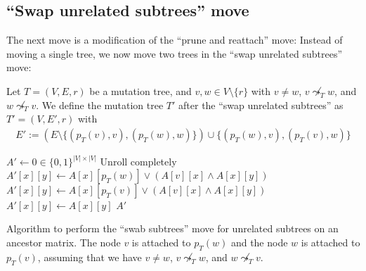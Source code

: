 \subsection{``Swap unrelated subtrees'' move}

The next move is a modification of the ``prune and reattach'' move: Instead of moving a single tree, we now move two trees in the ``swap unrelated subtrees'' move:

\begin{definition}
    \label{def:swap_unrelated_subtrees}
    Let $T = (V, E, r)$ be a mutation tree, and $v, w \in V \setminus \{r\}$ with $v \neq w$, $v \not\leadsto_T w$, and $w \not\leadsto_T v$. We define the mutation tree $T'$ after the ``swap unrelated subtrees'' as $T' = (V, E', r)$ with
    \begin{align*}
        E' := (E \setminus \{(p_T(v), v), (p_T(w), w)\}) \cup \{(p_T(w), v), (p_T(v), w)\}
    \end{align*}
\end{definition}

\begin{algorithm}
    \begin{algorithmic}[1]
        \State $A' \leftarrow 0 \in \{0,1\}^{|V| \times |V|}$
             \Comment Unroll completely
                    \State $A'[x][y] \leftarrow A[x][p_T(w)] \vee (A[v][x] \wedge A[x][y])$
                    \State $A'[x][y] \leftarrow A[x][p_T(v)] \vee (A[v][x] \wedge A[x][y])$
                \Else
                    \State $A'[x][y] \leftarrow A[x][y]$
                \EndIf
            \EndFor
        \EndFor
        \State \Return $A'$
        \EndFunction
    \end{algorithmic}
    \caption{Algorithm to perform the ``swab subtrees'' move for unrelated subtrees on an ancestor matrix. The node $v$ is attached to $p_T(w)$ and the node $w$ is attached to $p_T(v)$, assuming that we have $v \neq w$, $v \not\leadsto_T w$, and $w \not\leadsto_T v$.}
    \label{alg:am_swap_unrelated}
\end{algorithm}

